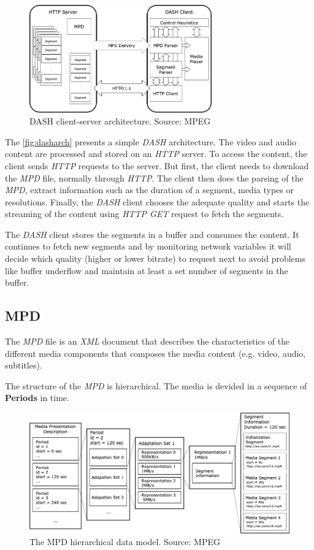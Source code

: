 \begin{figure}[h]
  \centering
  \includegraphics[width=0.7\textwidth]{img/dasharch.png}
  \caption{DASH client-server architecture. Source: MPEG \cite{ios1}}
  \label{fig:dasharch}
\end{figure}

The \autoref{fig:dasharch} presents a simple \textit{DASH} architecture. The video and audio
content are processed and stored on an \textit{HTTP} server. To access the content, the client
sends \textit{HTTP} requests to the server. But first, the client needs to download the 
\textit{MPD} file, normally through \textit{HTTP}. The client then does the
parsing of the \textit{MPD}, extract information such as the duration of a segment, media types or 
resolutions. Finally, the \textit{DASH} client chooses the adequate quality and starts the 
streaming of the content using \textit{HTTP GET} request to fetch the segments.

The \textit{DASH} client stores the segments in a buffer and consumes the content. It continues
to fetch new segments and by monitoring network variables it will decide which quality (higher
or lower bitrate) to request next to avoid problems like buffer underflow and maintain at 
least a set number of segments in the buffer.

\subsection{MPD}
\label{sec:mpd}
The \textit{MPD} file is an \textit{XML} document that describes the characteristics
of the different media components that composes the media content (e.g. video, audio, subtitles).

The structure of the \textit{MPD} is hierarchical. The media is devided in a sequence of
\textbf{Periods} in time. 

\begin{figure}[h]
  \centering
  \includegraphics[width=\textwidth]{img/mpd.png}
  \caption{The MPD hierarchical data model. Source: MPEG \cite{ios1}}
  \label{fig:mpd}
\end{figure}

